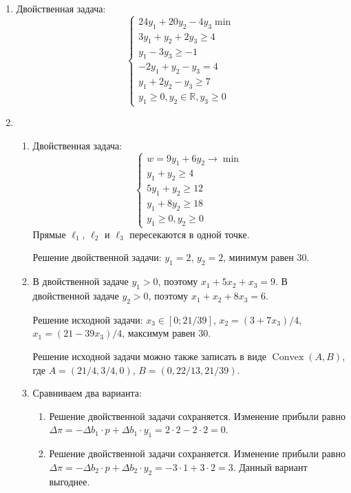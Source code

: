 \documentclass[12pt]{article}
\DeclareMathOperator{\Convex}{Convex}
\newcommand \RR{\mathbb{R}}
\begin{document}
\begin{enumerate}
    \item 
    Двойственная задача:
    \[
    \begin{cases}
        24y_1 + 20y_2 -4 y_3 \min \\
        3y_1 + y_2 +2 y_3 \geq 4 \\
        y_1 -3y_3 \geq -1 \\
        -2y_1 + y_2 -y_3 = 4 \\
        y_1 + 2y_2 - y_3 \geq 7 \\
        y_1 \geq 0, y_2 \in \RR, y_3 \geq 0 
    \end{cases}
    \]
    
    
    \item 
    \begin{enumerate}
        \item 
    Двойственная задача:
    \[
    \begin{cases}
    w = 9y_1 + 6y_2 \to \min \\
    y_1 + y_2 \geq 4 \\
    5y_1 + y_2 \geq 12 \\
    y_1 + 8y_2 \geq 18 \\
    y_1 \geq 0, y_2 \geq 0 
    \end{cases}
    \]
    Прямые $\ell_1$, $\ell_2$ и $\ell_3$ пересекаются в одной точке. 
    
    Решение двойственной задачи: $y_1 = 2$, $y_2 = 2$, минимум равен $30$.

    \item В двойственной задаче $y_1 > 0$, поэтому $x_1 + 5x_2 + x_3 = 9$. 
    В двойственной задаче $y_2 > 0$, поэтому $x_1 + x_2 + 8x_3 = 6$.
    
    Решение исходной задачи: $x_3 \in [0; 21/39]$, $x_2 = (3 + 7x_3) / 4$, $x_1 = (21 - 39 x_3) / 4$,  максимум равен $30$. 

    Решение исходной задачи можно также записать в виде $\Convex(A, B)$, где $A = (21/4, 3/4, 0)$, $B = (0, 22/13, 21/39)$.

    \item Сравниваем два варианта:    
    \begin{enumerate}
        \item Решение двойственной задачи сохраняется. 
        Изменение прибыли равно $\Delta \pi = - \Delta b_1 \cdot p + \Delta b_1 \cdot y_1 =  2 \cdot 2 - 2 \cdot 2 = 0$.
        \item Решение двойственной задачи сохраняется. 
        Изменение прибыли равно $\Delta \pi = - \Delta b_2 \cdot p + \Delta b_2 \cdot y_2 =  -3 \cdot 1 + 3 \cdot 2 = 3$.
        Данный вариант выгоднее. 
    \end{enumerate}
\end{enumerate}


\end{enumerate}
\end{document}
